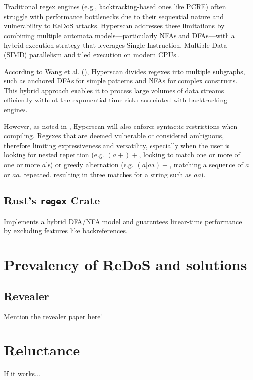 Traditional regex engines (e.g., backtracking-based ones like PCRE) often struggle with performance bottlenecks due to their sequential nature and vulnerability to ReDoS attacks. Hyperscan addresses these limitations by combining multiple automata models—particularly NFAs and DFAs—with a hybrid execution strategy that leverages Single Instruction, Multiple Data (SIMD) parallelism and tiled execution on modern CPUs .

According to Wang et al. (\cite{hyperscan}), Hyperscan divides regexes into multiple subgraphs, such as anchored DFAs for simple patterns and NFAs for complex constructs. This hybrid approach enables it to process large volumes of data streams efficiently without the exponential-time risks associated with backtracking engines.

However, as noted in \cite{hyperscan}, Hyperscan will also enforce syntactic restrictions when compiling. Regexes that are deemed vulnerable or considered ambiguous, therefore limiting expressiveness and versatility, especially when the user is looking for nested repetition (e.g. $(a+)+$, looking to match one or more of one or more $a$'s) or greedy alternation (e.g. $(a|aa)+$, matching a sequence of $a$ or $aa$, repeated, resulting in three matches for a string such as $aa$).

\subsection{Rust's \texttt{regex} Crate}
Implements a hybrid DFA/NFA model and guarantees linear-time performance by excluding features like backreferences.

\section{Prevalency of ReDoS and solutions}
\subsection{Revealer}
Mention the revealer paper here!

\section{Reluctance}
If it works...